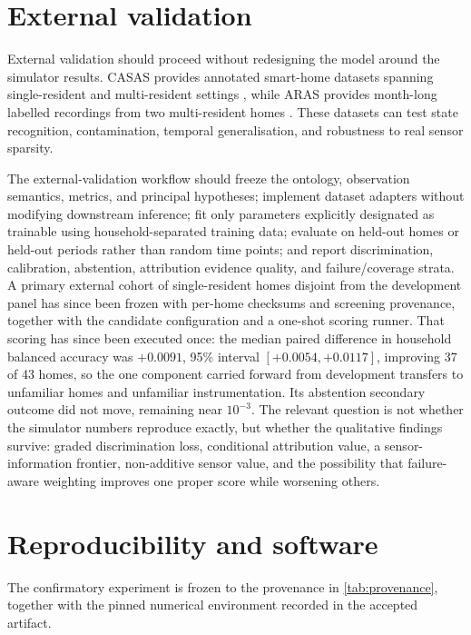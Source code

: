 \documentclass[11pt]{article}
\begin{document}
\section{External validation}
\label{sec:external}

External validation should proceed without redesigning the model around the simulator results. CASAS provides annotated smart-home datasets spanning single-resident and multi-resident settings \citep{cook2013casas}, while ARAS provides month-long labelled recordings from two multi-resident homes \citep{alemdar2013aras}. These datasets can test state recognition, contamination, temporal generalisation, and robustness to real sensor sparsity.

The external-validation workflow should freeze the ontology, observation semantics, metrics, and principal hypotheses; implement dataset adapters without modifying downstream inference; fit only parameters explicitly designated as trainable using household-separated training data; evaluate on held-out homes or held-out periods rather than random time points; and report discrimination, calibration, abstention, attribution evidence quality, and failure/coverage strata. A primary external cohort of single-resident homes disjoint from the development panel has since been frozen with per-home checksums and screening provenance, together with the candidate configuration and a one-shot scoring runner. That scoring has since been executed once: the median paired difference in household balanced accuracy was $+0.0091$, 95\% interval $[+0.0054, +0.0117]$, improving 37 of 43 homes, so the one component carried forward from development transfers to unfamiliar homes and unfamiliar instrumentation. Its abstention secondary outcome did not move, remaining near $10^{-3}$. The relevant question is not whether the simulator numbers reproduce exactly, but whether the qualitative findings survive: graded discrimination loss, conditional attribution value, a sensor-information frontier, non-additive sensor value, and the possibility that failure-aware weighting improves one proper score while worsening others.

\section{Reproducibility and software}

The confirmatory experiment is frozen to the provenance in
\cref{tab:provenance}, together with the pinned numerical environment recorded in
the accepted artifact.
\end{document}
